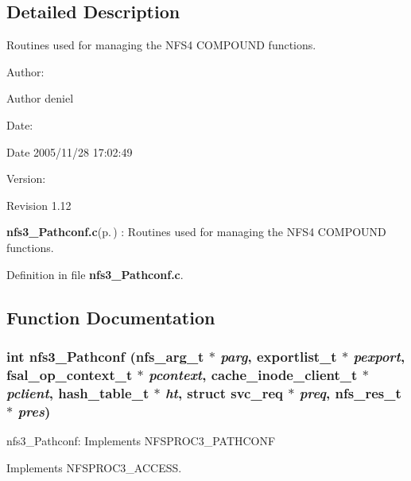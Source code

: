\subsection{Detailed Description}
Routines used for managing the NFS4 COMPOUND functions. 

\begin{Desc}
\item[Author:]\begin{Desc}
\item[Author]deniel \end{Desc}
\end{Desc}
\begin{Desc}
\item[Date:]\begin{Desc}
\item[Date]2005/11/28 17:02:49 \end{Desc}
\end{Desc}
\begin{Desc}
\item[Version:]\begin{Desc}
\item[Revision]1.12 \end{Desc}
\end{Desc}
{\bf nfs3\_\-Pathconf.c}{\rm (p.\,\pageref{nfs3__Pathconf_8c})} : Routines used for managing the NFS4 COMPOUND functions.

Definition in file {\bf nfs3\_\-Pathconf.c}.

\subsection{Function Documentation}
\subsubsection{\setlength{\rightskip}{0pt plus 5cm}int nfs3\_\-Pathconf (nfs\_\-arg\_\-t $\ast$ {\em parg}, exportlist\_\-t $\ast$ {\em pexport}, fsal\_\-op\_\-context\_\-t $\ast$ {\em pcontext}, cache\_\-inode\_\-client\_\-t $\ast$ {\em pclient}, hash\_\-table\_\-t $\ast$ {\em ht}, struct svc\_\-req $\ast$ {\em preq}, nfs\_\-res\_\-t $\ast$ {\em pres})}\label{nfs3__Pathconf_8c_a0}


nfs3\_\-Pathconf: Implements NFSPROC3\_\-PATHCONF

Implements NFSPROC3\_\-ACCESS.

